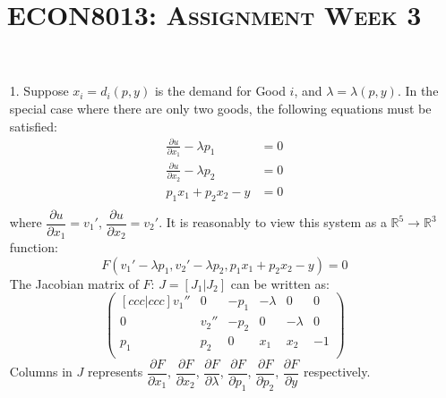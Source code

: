 \documentclass{article}
\begin{document}
\title{\textsc{ECON8013: Assignment Week 3}}\maketitle

\begin{enumerate}
    \item[1. ] Suppose $x_i = d_i(p,y)$ is the demand for Good $i$, and $\lambda=\lambda(p,y)$. 
    In the special case where there are only two goods, the following equations must be satisfied:
        \begin{align*}
            \frac{\partial u}{\partial x_1} - \lambda p_1 &= 0 \\
            \frac{\partial u}{\partial x_2} - \lambda p_2 &= 0 \\
            p_1 x_1 + p_2 x_2 - y &= 0 \\ 
        \end{align*}
    where $\dfrac{\partial u}{\partial x_1}=v_1'$, $\dfrac{\partial u}{\partial x_2}=v_2'$.
    It is reasonably to view this system as a $\mathbb{R}^5 \to \mathbb{R}^3$ function:
        $$ F(v_1' - \lambda p_1, v_2' - \lambda p_2, p_1 x_1 + p_2 x_2 - y) = 0 $$
    The Jacobian matrix of $F$: $J = [J_1|J_2]$ can be written as:
        \begin{equation*}
            \begin{pmatrix}[ccc|ccc]
                v_1'' &      0 & -p_1    & -\lambda &        0 &  0 \\
                0     &  v_2'' & -p_2    &        0 & -\lambda &  0 \\
                p_1   &  p_2   &    0    &      x_1 &      x_2 & -1 \\
            \end{pmatrix}
        \end{equation*}
    Columns in $J$ represents $\dfrac{\partial F}{\partial x_1}$, $\dfrac{\partial F}{\partial x_2}$,
    $\dfrac{\partial F}{\partial \lambda}$, $\dfrac{\partial F}{\partial p_1}$, 
    $\dfrac{\partial F}{\partial p_2}$, $\dfrac{\partial F}{\partial y}$ respectively.
    

\end{enumerate}
\end{document}
